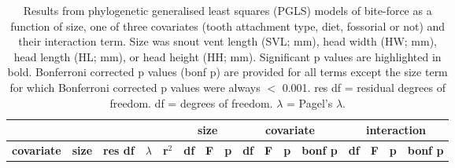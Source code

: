 
\begin{longtable}{lccccccccccccccc}

\caption{Results from phylogenetic generalised least squares (PGLS) models of bite-force as a function of size, one of three covariates (tooth attachment type, diet, fossorial or not) and their interaction term. Size was snout vent length (SVL; mm), head width (HW; mm), head length (HL; mm), or head height (HH; mm). Significant p values are highlighted in bold. Bonferroni corrected p values (bonf p) are provided for all terms except the size term for which Bonferroni corrected p values were always $<$ 0.001. res df = residual degrees of freedom. df = degrees of freedom. $\lambda$ = Pagel's $\lambda$.}\\ 


\hline

\multicolumn{5}{c}{} &
\multicolumn{3}{c}{\textbf{size}} &
\multicolumn{4}{c}{\textbf{covariate}} &
\multicolumn{4}{c}{\textbf{interaction}}\\

  \hline
  \textbf{covariate} &
  \textbf{size} &
  \textbf{res df} &
  \textbf{$\lambda$} &
  \textbf{r$^2$} &
  \textbf{df} &
  \textbf{F} &
  \textbf{p} &
  \textbf{df} &
  \textbf{F} &
  \textbf{p} &
  \textbf{bonf p} &
  \textbf{df} &
  \textbf{F} &
  \textbf{p} &
  \textbf{bonf p} \\


\end{longtable}

